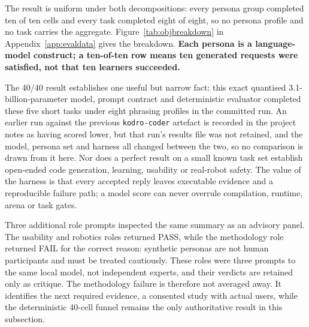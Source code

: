\documentclass[11pt,a4paper]{report}
\begin{document}
The result is uniform under both decompositions: every persona group completed ten of ten cells and every task completed eight of eight, so no persona profile and no task carries the aggregate. Figure~\ref{tab:objbreakdown} in Appendix~\ref{app:evaldata} gives the breakdown. \textbf{Each persona is a language-model construct; a ten-of-ten row means ten generated requests were satisfied, not that ten learners succeeded.}

The 40/40 result establishes one useful but narrow fact: this exact quantised 3.1-billion-parameter model, prompt contract and deterministic evaluator completed these five short tasks under eight phrasing profiles in the committed run. An earlier run against the previous \texttt{kodro-coder} artefact is recorded in the project notes as having scored lower, but that run's results file was not retained, and the model, persona set and harness all changed between the two, so no comparison is drawn from it here. Nor does a perfect result on a small known task set establish open-ended code generation, learning, usability or real-robot safety. The value of the harness is that every accepted reply leaves executable evidence and a reproducible failure path; a model score can never overrule compilation, runtime, arena or task gates.

Three additional role prompts inspected the same summary as an advisory panel. The usability and robotics roles returned PASS, while the methodology role returned FAIL for the correct reason: synthetic personas are not human participants and must be treated cautiously. These roles were three prompts to the same local model, not independent experts, and their verdicts are retained only as critique. The methodology failure is therefore not averaged away. It identifies the next required evidence, a consented study with actual users, while the deterministic 40-cell funnel remains the only authoritative result in this subsection.
\end{document}
